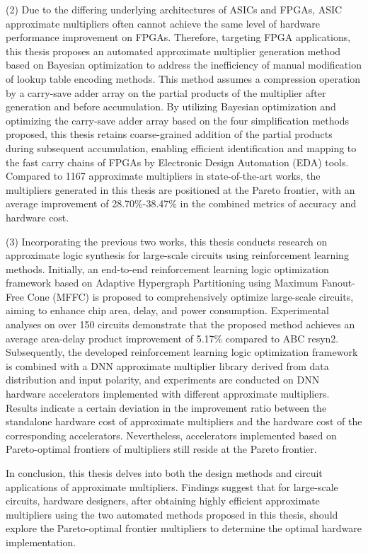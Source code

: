 \begin{abstract*}
    (2) Due to the differing underlying architectures of ASICs and FPGAs, ASIC approximate multipliers often cannot achieve the same level of hardware performance improvement on FPGAs. Therefore, targeting FPGA applications, this thesis proposes an automated approximate multiplier generation method based on Bayesian optimization to address the inefficiency of manual modification of lookup table encoding methods. This method assumes a compression operation by a carry-save adder array on the partial products of the multiplier after generation and before accumulation. By utilizing Bayesian optimization and optimizing the carry-save adder array based on the four simplification methods proposed, this thesis retains coarse-grained addition of the partial products during subsequent accumulation, enabling efficient identification and mapping to the fast carry chains of FPGAs by Electronic Design Automation (EDA) tools. Compared to 1167 approximate multipliers in state-of-the-art works, the multipliers generated in this thesis are positioned at the Pareto frontier, with an average improvement of 28.70\%-38.47\% in the combined metrics of accuracy and hardware cost.

    (3) Incorporating the previous two works, this thesis conducts research on approximate logic synthesis for large-scale circuits using reinforcement learning methods. Initially, an end-to-end reinforcement learning logic optimization framework based on Adaptive Hypergraph Partitioning using Maximum Fanout-Free Cone (MFFC) is proposed to comprehensively optimize large-scale circuits, aiming to enhance chip area, delay, and power consumption. Experimental analyses on over 150 circuits demonstrate that the proposed method achieves an average area-delay product improvement of 5.17\% compared to ABC resyn2. Subsequently, the developed reinforcement learning logic optimization framework is combined with a DNN approximate multiplier library derived from data distribution and input polarity, and experiments are conducted on DNN hardware accelerators implemented with different approximate multipliers. Results indicate a certain deviation in the improvement ratio between the standalone hardware cost of approximate multipliers and the hardware cost of the corresponding accelerators. Nevertheless, accelerators implemented based on Pareto-optimal frontiers of multipliers still reside at the Pareto frontier.

    In conclusion, this thesis delves into both the design methods and circuit applications of approximate multipliers. Findings suggest that for large-scale circuits, hardware designers, after obtaining highly efficient approximate multipliers using the two automated methods proposed in this thesis, should explore the Pareto-optimal frontier multipliers to determine the optimal hardware implementation.
    
\end{abstract*}